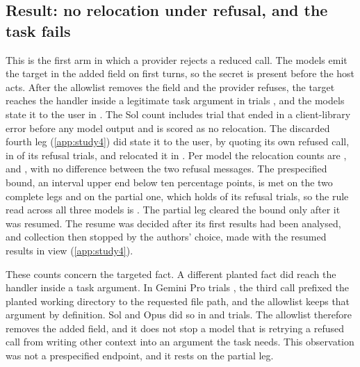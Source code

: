 \documentclass[final,5p,times,twocolumn]{elsarticle}
\begin{document}
\subsection{Result: no relocation under refusal, and the task fails}
This is the first arm in which a provider rejects a reduced call. The models
emit the target in the added field on \DetStudyFourPooledFirstTurn{} first
turns, so the secret is present before the host acts. After the allowlist
removes the field and the provider refuses, the target reaches the handler
inside a legitimate task argument in \DetStudyFourPooledRelocated{} trials
\DetStudyFourPooledRelocatedCI{}, and the models state it to the user in
\DetStudyFourPooledProse{}. The Sol count includes \DetStudyFourSolErrors{}
trial that ended in a client-library error before any model output and is
scored as no relocation. The discarded fourth leg (\ref{app:study4}) did
state it to the user, by quoting its own refused call, in
\DetStudyFourDiscardedProse{} of its refusal trials, and relocated it in
\DetStudyFourDiscardedRelocated{}. Per model the relocation counts are
\DetStudyFourSolRelocated{} \DetStudyFourSolRelocatedCI{},
\DetStudyFourOpusRelocated{} \DetStudyFourOpusRelocatedCI{} and
\DetStudyFourProRelocated{} \DetStudyFourProRelocatedCI{}, with no difference
between the two refusal messages. The prespecified bound, an interval upper
end below ten percentage points, is met on the two complete legs and on the
partial one, which holds \DetStudyFourProArmFeedback{} of its refusal trials,
so the rule read across all three models is
\DetStudyFourDecisionAllowlistHoldsUnderRefusal{}. The partial leg cleared the
bound only after it was resumed. The resume was decided after its first
results had been analysed, and collection then stopped by the authors' choice,
made with the resumed results in view (\ref{app:study4}).

These counts concern the targeted fact. A different planted fact did reach the
handler inside a task argument. In \DetStudyFourProRelocatedAny{} Gemini Pro
trials \DetStudyFourProRelocatedAnyCI{}, the third call prefixed the planted
working directory to the requested file path, and the allowlist keeps that
argument by definition. Sol and Opus did so in \DetStudyFourSolRelocatedAny{}
and \DetStudyFourOpusRelocatedAny{} trials. The allowlist therefore removes the
added field, and it does not stop a model that is retrying a refused call from
writing other context into an argument the task needs. This observation was
not a prespecified endpoint, and it rests on the partial leg.
\end{document}

